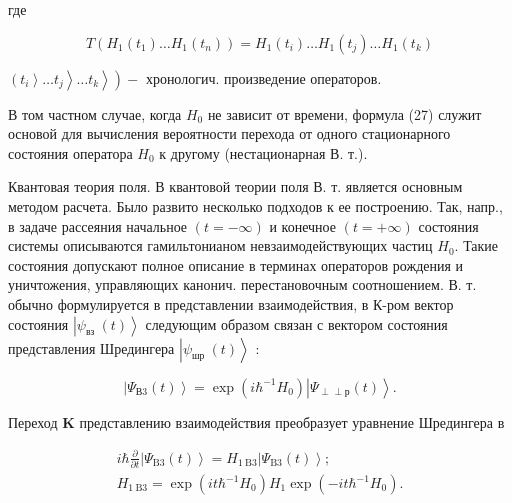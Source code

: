 \documentclass[10pt]{article}
\def\Perp{\perp\!\!\!\perp}
\begin{document}
где



\[

T\left(H_{1}\left(t_{1}\right) \ldots H_{1}\left(t_{n}\right)\right)=H_{1}\left(t_{i}\right) \ldots H_{1}\left(t_{j}\right) \ldots H_{1}\left(t_{k}\right)

\]



$\left.\left.\left.\left(t_{i}\right\rangle \ldots t_{j}\right\rangle \ldots t_{k}\right\rangle\right)-$ хронологич. произведение операторов.



В том частном случае, когда $H_{0}$ не зависит от времени, формула (27) служит основой для вычисления вероятности перехода от одного стационарного состояния оператора $H_{0}$ к другому (нестационарная В. т.).



Квантовая теория поля. В квантовой теории поля В. т. является основным методом расчета. Было развито несколько подходов к ее построению. Так, напр., в задаче рассеяния начальное $(t=-\infty)$ и конечное $(t=+\infty)$ состояния системы описываются гамильтонианом невзаимодействующих частиц $H_{0}$. Такие состояния допускают полное описание в терминах операторов рождения и уничтожения, управляющих канонич. перестановочным соотношением. В. т. обычно формулируется в представлении взаимодействия, в К-ром вектор состояния $\left|\psi_{\text {вз }}(t)\right\rangle$ следующим образом связан с вектором состояния представления Шредингера $\left|\psi_{\text {шр }}(t)\right\rangle$ :



\[

\left|\Psi_{\text {В3}}(t)\right\rangle=\exp \left(i \hbar^{-1} H_{0}\right)\left|\Psi_{\Perp р}(t)\right\rangle .

\]



Переход $\mathbf{K}$ представлению взаимодействия преобразует уравнение Шредингера в



\[

\begin{gathered}

i \hbar \frac{\partial}{\partial t}\left|\Psi_{\mathrm{B} 3}(t)\right\rangle=H_{1 \mathrm{~B} 3}\left|\Psi_{\mathrm{B} 3}(t)\right\rangle ; \\

H_{1 \mathrm{~B} 3}=\exp \left(i t \hbar^{-1} H_{0}\right) H_{1} \exp \left(-i t \hbar^{-1} H_{0}\right) .

\end{gathered}

\]
\end{document}
